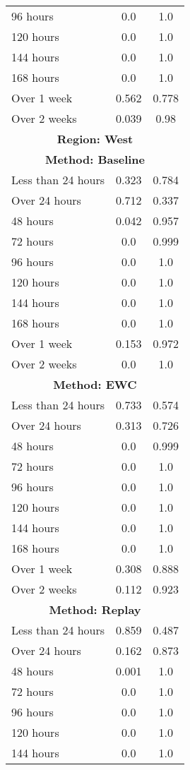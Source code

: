 \documentclass{article}
\begin{document}
\begin{longtable}{lcc}
96 hours & 0.0 & 1.0 \\
120 hours & 0.0 & 1.0 \\
144 hours & 0.0 & 1.0 \\
168 hours & 0.0 & 1.0 \\
Over 1 week & 0.562 & 0.778 \\
Over 2 weeks & 0.039 & 0.98 \\
\midrule
\midrule
\multicolumn{3}{c}{\textbf{Region: West}} \\
\multicolumn{3}{c}{\textbf{Method: Baseline}} \\
\midrule
Less than 24 hours & 0.323 & 0.784 \\
Over 24 hours & 0.712 & 0.337 \\
48 hours & 0.042 & 0.957 \\
72 hours & 0.0 & 0.999 \\
96 hours & 0.0 & 1.0 \\
120 hours & 0.0 & 1.0 \\
144 hours & 0.0 & 1.0 \\
168 hours & 0.0 & 1.0 \\
Over 1 week & 0.153 & 0.972 \\
Over 2 weeks & 0.0 & 1.0 \\
\midrule
\multicolumn{3}{c}{\textbf{Method: EWC}} \\
\midrule
Less than 24 hours & 0.733 & 0.574 \\
Over 24 hours & 0.313 & 0.726 \\
48 hours & 0.0 & 0.999 \\
72 hours & 0.0 & 1.0 \\
96 hours & 0.0 & 1.0 \\
120 hours & 0.0 & 1.0 \\
144 hours & 0.0 & 1.0 \\
168 hours & 0.0 & 1.0 \\
Over 1 week & 0.308 & 0.888 \\
Over 2 weeks & 0.112 & 0.923 \\
\midrule
\multicolumn{3}{c}{\textbf{Method: Replay}} \\
\midrule
Less than 24 hours & 0.859 & 0.487 \\
Over 24 hours & 0.162 & 0.873 \\
48 hours & 0.001 & 1.0 \\
72 hours & 0.0 & 1.0 \\
96 hours & 0.0 & 1.0 \\
120 hours & 0.0 & 1.0 \\
144 hours & 0.0 & 1.0 \\

\end{longtable}
\end{document}
